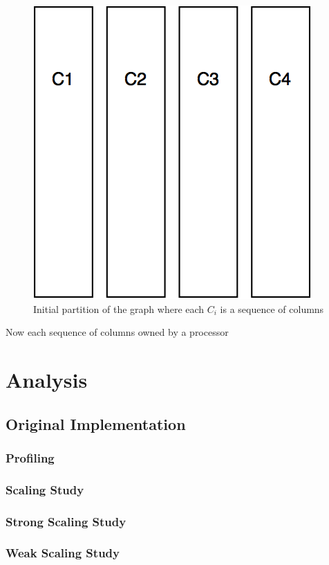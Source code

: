\documentclass[11pt]{article}
\begin{document}
\begin{figure}
\centering
\includegraphics[scale=0.2]{initial_partition.png}
\caption{Initial partition of the graph where each $C_i$ is a sequence of columns}
\label{fig:init_part}
\end{figure}

Now each sequence of columns owned by a processor

\section{Analysis}

\subsection{Original Implementation}
\subsubsection{Profiling} \label{sec:prof}
\subsubsection{Scaling Study} \label{sec:speedup}
\subsubsection{Strong Scaling Study}
\subsubsection{Weak Scaling Study}
\end{document}
